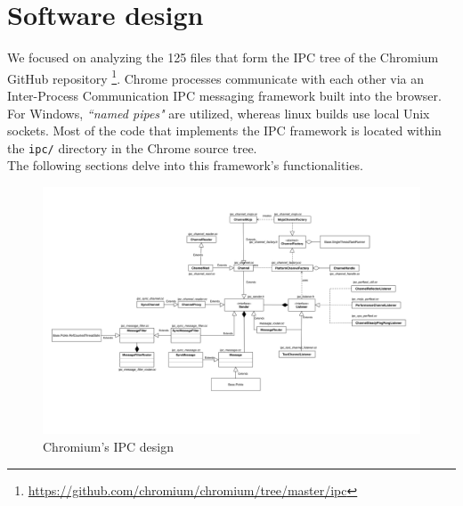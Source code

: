 \chapter{Software design}
\label{chap:design}



We focused on analyzing the 125 files that form the IPC tree of the Chromium GitHub repository \footnote{\url{https://github.com/chromium/chromium/tree/master/ipc}}. Chrome processes communicate with each other via an Inter-Process Communication IPC messaging framework built into the browser. For Windows, \textit{``named pipes"} are utilized, whereas linux builds use local Unix sockets. Most of the code that implements the IPC framework is located within the \texttt{ipc/} directory in the Chrome source tree.\\ 

\noindent The following sections delve into this framework's functionalities.
\begin{figure}
    \centering
    \hspace*{-2.5cm}
    \includegraphics[width=1.2\textwidth]{img/design_min.png}
    \caption{Chromium's IPC design}
    \label{fig:design}
\end{figure}
